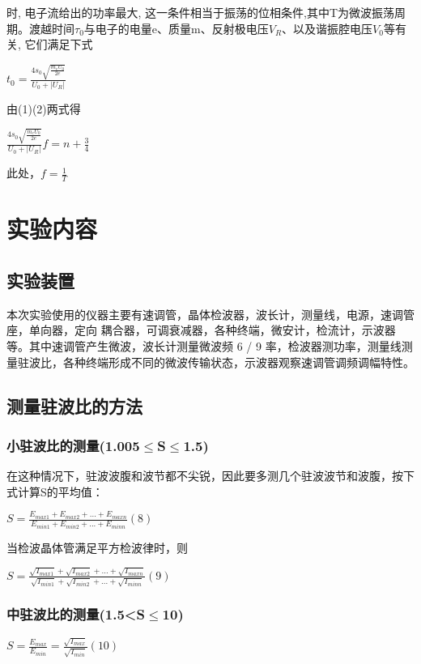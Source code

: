 \documentclass{hfutpaper}
\begin{document}
时, 电子流给出的功率最大, 这一条件相当于振荡的位相条件,其中T为微波振荡周期。渡越时间$\tau_{0}$与电子的电量e、质量m、反射极电压$V_{R}$、以及谐振腔电压$V_{0}$等有关, 它们满足下式

\begin{center}
	$t_{0}=\frac{4s_{0}\sqrt{\frac{m_{e}U_{0}}{2e}}}{U_{0}+|U_{R}|}$\\
\end{center}
	由(1)(2)两式得\\
\begin{center}
	$\frac{4s_{0}\sqrt{\frac{m_{e}U_{0}}{2e}}}{U_{0}+|U_{R}|}f=n+\frac{3}{4}$\\
\end{center}
	此处，$f=\frac{1}{T}$\\
\clearpage
\section{实验内容}
\subsection{实验装置}
本次实验使用的仪器主要有速调管，晶体检波器，波长计，测量线，电源，速调管座，单向器，定向 耦合器，可调衰减器，各种终端，微安计，检流计，示波器等。其中速调管产生微波，波长计测量微波频 6 / 9 率，检波器测功率，测量线测量驻波比，各种终端形成不同的微波传输状态，示波器观察速调管调频调幅特性。


\subsection{测量驻波比的方法}
\subsubsection{小驻波比的测量(1.005$\le$S$\le$1.5)}
在这种情况下，驻波波腹和波节都不尖锐，因此要多测几个驻波波节和波腹，按下式计算S的平均值：\\
\begin{center}
	$S=\frac{E_{max1}+E_{max2}+...+E_{maxn}}{E_{min1}+E_{min2}+...+E_{minn}}(8)$
\end{center}
当检波晶体管满足平方检波律时，则\\
\begin{center}
	$S=\frac{\sqrt{I_{max1}}+\sqrt{I_{max2}}+...+\sqrt{I_{maxn}}}{\sqrt{I_{min1}}+\sqrt{I_{min2}}+...+\sqrt{I_{minn}}}(9)$
\end{center}
\subsubsection{中驻波比的测量(1.5<S$\le$10)}
\begin{center}
	$S=\frac{E_{max}}{E_{min}}=\frac{\sqrt{I_{max}}}{\sqrt{I_{min}}}(10)$
\end{center}
\end{document}

